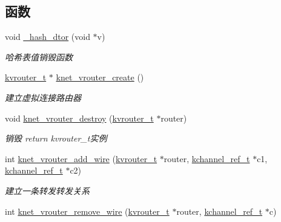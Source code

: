 \subsection*{函数}
\begin{DoxyCompactItemize}
\item 
void \hyperlink{a00109_a564412961a891d74eca2cdb5015b35bb_a564412961a891d74eca2cdb5015b35bb}{\+\_\+hash\+\_\+dtor} (void $\ast$v)
\begin{DoxyCompactList}\small\item\em 哈希表值销毁函数 \end{DoxyCompactList}\item 
\hyperlink{a00056_a9863a6202df1fb40e2b32c673ad93267_a9863a6202df1fb40e2b32c673ad93267}{kvrouter\+\_\+t} $\ast$ \hyperlink{a00124_gac2a99e706273f22db2ea363b1700bfab_gac2a99e706273f22db2ea363b1700bfab}{knet\+\_\+vrouter\+\_\+create} ()
\begin{DoxyCompactList}\small\item\em 建立虚拟连接路由器 \end{DoxyCompactList}\item 
void \hyperlink{a00124_gad0660abac611870c1255dcfe9d36f67e_gad0660abac611870c1255dcfe9d36f67e}{knet\+\_\+vrouter\+\_\+destroy} (\hyperlink{a00056_a9863a6202df1fb40e2b32c673ad93267_a9863a6202df1fb40e2b32c673ad93267}{kvrouter\+\_\+t} $\ast$router)
\begin{DoxyCompactList}\small\item\em 销毁 return kvrouter\+\_\+t实例 \end{DoxyCompactList}\item 
int \hyperlink{a00124_ga7256979701c32356201e853b7f3df1ca_ga7256979701c32356201e853b7f3df1ca}{knet\+\_\+vrouter\+\_\+add\+\_\+wire} (\hyperlink{a00056_a9863a6202df1fb40e2b32c673ad93267_a9863a6202df1fb40e2b32c673ad93267}{kvrouter\+\_\+t} $\ast$router, \hyperlink{a00056_a3b7e82599367eade261456f60ebe2cd9_a3b7e82599367eade261456f60ebe2cd9}{kchannel\+\_\+ref\+\_\+t} $\ast$c1, \hyperlink{a00056_a3b7e82599367eade261456f60ebe2cd9_a3b7e82599367eade261456f60ebe2cd9}{kchannel\+\_\+ref\+\_\+t} $\ast$c2)
\begin{DoxyCompactList}\small\item\em 建立一条转发转发关系 \end{DoxyCompactList}\item 
int \hyperlink{a00124_gaa5052bac7f443e497fcc042f13026bfc_gaa5052bac7f443e497fcc042f13026bfc}{knet\+\_\+vrouter\+\_\+remove\+\_\+wire} (\hyperlink{a00056_a9863a6202df1fb40e2b32c673ad93267_a9863a6202df1fb40e2b32c673ad93267}{kvrouter\+\_\+t} $\ast$router, \hyperlink{a00056_a3b7e82599367eade261456f60ebe2cd9_a3b7e82599367eade261456f60ebe2cd9}{kchannel\+\_\+ref\+\_\+t} $\ast$c)

\end{DoxyCompactItemize}
